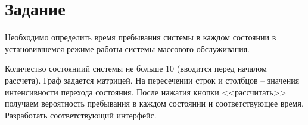 \chapter{Задание}

Необходимо определить время пребывания системы в каждом состоянии в установившемся режиме 
работы системы массового обслуживания.

Количество состояниий системы не больше 10 (вводится перед началом рассчета). 
Граф задается матрицей. На пересечении строк и столбцов -- значения интенсивности перехода состояния.
После нажатия кнопки <<рассчитать>> получаем вероятность пребывания в каждом состоянии и соответствующее время.
Разработать соответствующий интерфейс.
